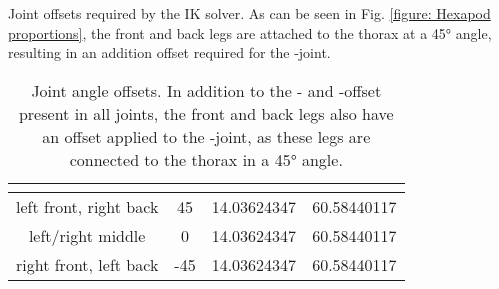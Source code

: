 Joint offsets required by the IK solver. 
As can be seen in Fig. \ref{figure: Hexapod proportions}, the front and back legs are attached to the thorax at a 45° angle, resulting in an addition offset required for the \textalpha-joint.
{\def\arraystretch{1.4}\tabcolsep=5pt
	\begin{table}
		\centering
		\begin{tabular}{| c | c | c | c |} 
			\hline
			& \textbf{\textalpha} & \textbf{\textbeta} & \textbf{\textgamma} \\ [0.5ex] 
			\hline
			\hline
			left front, right back & 45 & 14.03624347 & 60.58440117  \\ 
			
			left/right middle & 0 & 14.03624347 & 60.58440117 \\
			
			right front, left back & -45 & 14.03624347 & 60.58440117 \\
			\hline
		\end{tabular}
		\caption[Joint position offsets]{Joint angle offsets. In addition to the \textbeta- and \textgamma-offset present in all joints, the front and back legs also have an offset applied to the \textalpha-joint, as these legs are connected to the thorax in a 45° angle.}
		\label{table:Joint position offsets}
	\end{table}
}





